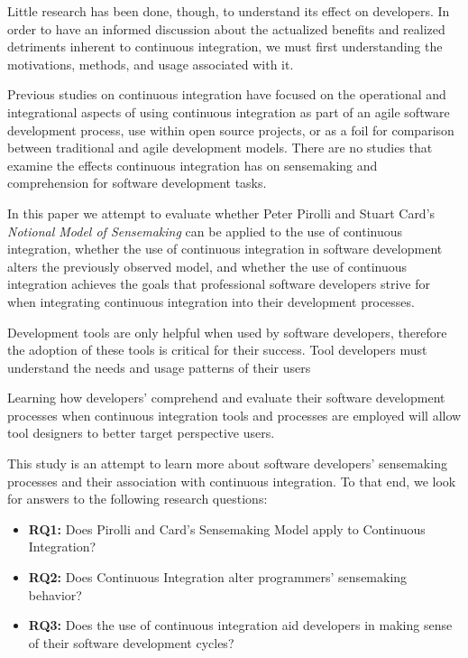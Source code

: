 \documentclass{sig-alternate}
\begin{document}
Little research has been done, though, to understand its effect on developers. In order to have an informed discussion about the actualized benefits and realized detriments inherent to continuous integration, we must first understanding the motivations, methods, and usage associated with it.

Previous studies on continuous integration have focused on the operational and integrational aspects of using continuous integration as part of an agile software development process\cite{miller:hundreddays}\cite{olsson:climbingstairway}, use within open source projects\cite{deshpande:ci_opensource}, or as a foil for comparison between traditional and agile development models\cite{staahl:modelingdiffs}. There are no studies that examine the effects continuous integration has on sensemaking and comprehension for software development tasks.

In this paper we attempt to evaluate whether Peter Pirolli and Stuart Card's \textit{Notional Model of Sensemaking}\cite{pirolli:sensemaking} can be applied to the use of continuous integration, whether the use of continuous integration in software development alters the previously observed model, and whether the use of continuous integration achieves the goals that professional software developers strive for when integrating continuous integration into their development processes.

Development tools are only helpful when used by software developers, therefore the adoption of these tools is critical for their success. Tool developers must understand the needs and usage patterns of their users

Learning how developers' comprehend and evaluate their software development processes when continuous integration tools and processes are employed will allow tool designers to better target perspective users.

This study is an attempt to learn more about software developers' sensemaking processes and their association with continuous integration. To that end, we look for answers to the following research questions:
\begin{itemize}
\item \textbf{RQ1:} Does Pirolli and Card's Sensemaking Model apply to Continuous Integration?
\item \textbf{RQ2:} Does Continuous Integration alter programmers' sensemaking behavior?
\item \textbf{RQ3:} Does the use of continuous integration aid developers in making sense of their software development cycles?

\end{itemize}
\end{document}
